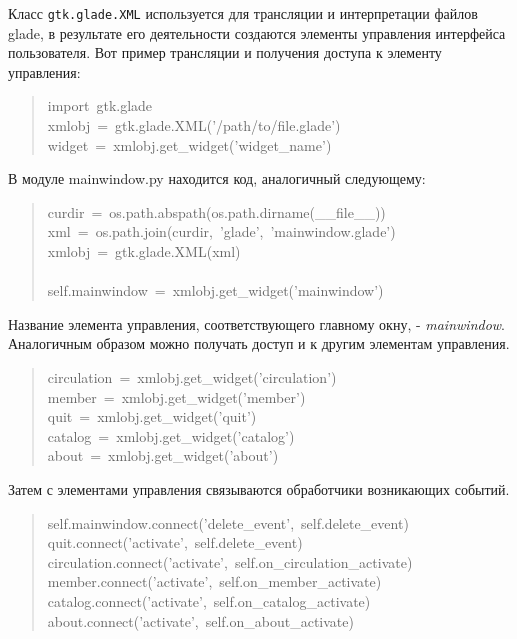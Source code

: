 \documentclass[14pt,a4paper,openany,twoside,final]{extbook}
\providecommand*{\DUroletitlereference}[1]{\textsl{#1}}
\begin{document}
Класс \texttt{gtk.glade.XML} используется для трансляции и интерпретации
файлов glade, в результате его деятельности создаются элементы
управления интерфейса пользователя.  Вот пример трансляции и получения
доступа к элементу управления:

\begin{quote}{\ttfamily \raggedright \noindent
import~gtk.glade\\
xmlobj~=~gtk.glade.XML('/path/to/file.glade')\\
widget~=~xmlobj.get\_widget('widget\_name')
}
\end{quote}

В модуле mainwindow.py находится код, аналогичный следующему:

\begin{quote}{\ttfamily \raggedright \noindent
curdir~=~os.path.abspath(os.path.dirname(\_\_file\_\_))\\
xml~=~os.path.join(curdir,~'glade',~'mainwindow.glade')\\
xmlobj~=~gtk.glade.XML(xml)\\
~\\
self.mainwindow~=~xmlobj.get\_widget('mainwindow')
}
\end{quote}

Название элемента управления, соответствующего главному окну, -
\DUroletitlereference{mainwindow}.  Аналогичным образом можно получать доступ и к другим
элементам управления.

\begin{quote}{\ttfamily \raggedright \noindent
circulation~=~xmlobj.get\_widget('circulation')\\
member~=~xmlobj.get\_widget('member')\\
quit~=~xmlobj.get\_widget('quit')\\
catalog~=~xmlobj.get\_widget('catalog')\\
about~=~xmlobj.get\_widget('about')
}
\end{quote}

Затем с элементами управления связываются обработчики возникающих
событий.

\begin{quote}{\ttfamily \raggedright \noindent
self.mainwindow.connect('delete\_event',~self.delete\_event)\\
quit.connect('activate',~self.delete\_event)\\
circulation.connect('activate',~self.on\_circulation\_activate)\\
member.connect('activate',~self.on\_member\_activate)\\
catalog.connect('activate',~self.on\_catalog\_activate)\\
about.connect('activate',~self.on\_about\_activate)
}
\end{quote}
\end{document}
